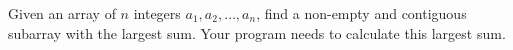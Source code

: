 Given an array of $n$ integers $a_1,a_2,\ldots,a_n$, find a non-empty and contiguous subarray with the largest sum.
Your program needs to calculate this largest sum.